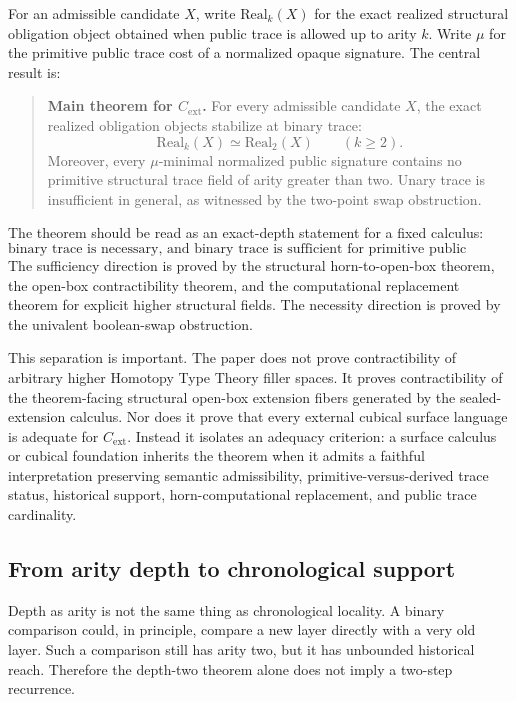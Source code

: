 For an admissible candidate \(X\), write \(\mathrm{Real}_k(X)\) for the exact
realized structural obligation object obtained when public trace is allowed up
to arity \(k\).  Write \(\mu\) for the primitive public trace cost of a normalized
opaque signature.  The central result is:
\begin{quote}
\textbf{Main theorem for \(C_{\mathrm{ext}}\).}
For every admissible candidate \(X\), the exact realized obligation objects
stabilize at binary trace:
\[
  \mathrm{Real}_k(X) \simeq \mathrm{Real}_2(X)
  \qquad (k \geq 2).
\]
Moreover, every \(\mu\)-minimal normalized public signature contains no primitive
structural trace field of arity greater than two.  Unary trace is insufficient in
general, as witnessed by the two-point swap obstruction.
\end{quote}

The theorem should be read as an exact-depth statement for a fixed calculus:
\[
  \text{binary trace is necessary, and binary trace is sufficient for primitive
  public structural integration.}
\]
The sufficiency direction is proved by the structural horn-to-open-box theorem,
the open-box contractibility theorem, and the computational replacement theorem
for explicit higher structural fields.  The necessity direction is proved by the
univalent boolean-swap obstruction.

This separation is important.  The paper does not prove contractibility of
arbitrary higher Homotopy Type Theory filler spaces.  It proves contractibility
of the theorem-facing structural open-box extension fibers generated by the
sealed-extension calculus.  Nor does it prove that every external cubical surface
language is adequate for \(C_{\mathrm{ext}}\).  Instead it isolates an adequacy
criterion: a surface calculus or cubical foundation inherits the theorem when it
admits a faithful interpretation preserving semantic admissibility,
primitive-versus-derived trace status, historical support, horn-computational
replacement, and public trace cardinality.

\subsection{From arity depth to chronological support}

Depth as arity is not the same thing as chronological locality.  A binary
comparison could, in principle, compare a new layer directly with a very old
layer.  Such a comparison still has arity two, but it has unbounded historical
reach.  Therefore the depth-two theorem alone does not imply a two-step
recurrence.

